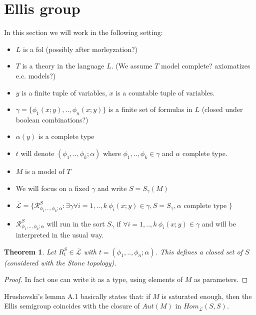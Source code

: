 \documentclass[11pt,a4paper]{article}
\theoremstyle{plain}
\newtheorem{theorem}{Theorem}[section]
\theoremstyle{definition}
\begin{document}
\section{Ellis group}
In this section we will work in the following setting:
\begin{itemize}
	\item	$L$ is a fol (possibly after morleyzation?)
	\item	$T$ is a theory in the language $L$. (We assume $T$ model complete? axiomatizes e.c. models?)
	\item	$y$ is a finite tuple of variables, $x$ is a countable tuple of variables.
	\item	$\gamma = \{ \phi_1(x;y),..,\phi_n(x;y) \}$ is a finite set of formulas in $L$ (closed under boolean combinations?)
	\item	$\alpha(y)$ is a complete type
	\item	$t$ will denote $(\phi_1,..,\phi_k;\alpha)$ where $\phi_1,..,\phi_k \in \gamma$ and $\alpha$ complete type.
	\item	$M$ is a model of $T$
	\item	We will focus on a fixed $\gamma$ and write $S = S_{\gamma}(M)$
	\item	$\mathcal{\overline{L}} = \{ \mathcal{R}^S_{\phi_1,..,\phi_k;\alpha}: \exists \gamma \forall i = 1,..,k \ \phi_i(x;y) \in \gamma , S= S_{\gamma}, \alpha \text{ complete type }\}$
	\item	$\mathcal{R}^S_{\phi_1,..,\phi_k;\alpha}$ will run in the sort $S_\gamma$ if $\forall i=1,..,k \ \phi_i(x;y) \in \gamma$ and will be interpreted in the usual way.
\end{itemize}

\begin{theorem}
	
	Let $R^S_t \in \mathcal{\overline{L}}$ with $t = (\phi_1,..,\phi_n; \alpha)$. This defines a closed set of $S$ (considered with the Stone topology).
	
\end{theorem}

\begin{proof}

	In fact one can write it as a type, using elements of $M$ as parameters.

\end{proof}


Hrushovski's lemma A.1 basically states that: if $M$ is saturated enough, then the Ellis semigroup coincides with the closure of $Aut(M)$ in $Hom_{\mathcal{\overline{L}}}(S,S)$.
\end{document}
